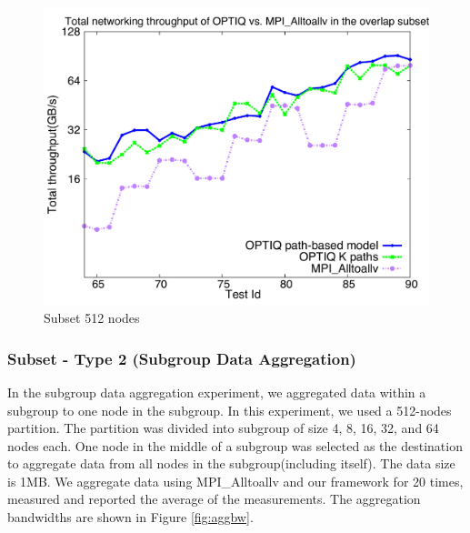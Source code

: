 \begin{figure}[!htb]
\vspace{-0.1in}
\centering
\includegraphics[scale=0.30]{figures/subset_512.pdf}
\vspace{-0.1in}
\caption{Subset 512 nodes}
\vspace{-0.1in}
\label{fig:subset_512}
\end{figure}

\subsubsection{Subset - Type 2 (Subgroup Data Aggregation)}

In the subgroup data aggregation experiment, we aggregated data within a subgroup to one node in the subgroup. In this experiment, we used a 512-nodes partition. The partition was divided into subgroup of size 4, 8, 16, 32, and 64 nodes each. One node in the middle of a subgroup was selected as the destination to aggregate data from all nodes in the subgroup(including itself). The data size is 1MB. We aggregate data using MPI\_Alltoallv and our framework for 20 times, measured and reported the average of the measurements. The aggregation bandwidths are shown in Figure \ref{fig:aggbw}.

